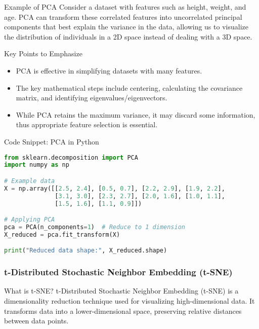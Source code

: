 \documentclass[aspectratio=169]{beamer}
\begin{document}
\begin{frame}[fragile]{Example of PCA}
    Consider a dataset with features such as height, weight, and age. 
    PCA can transform these correlated features into uncorrelated principal components that best explain the variance in the data, 
    allowing us to visualize the distribution of individuals in a 2D space instead of dealing with a 3D space.
\end{frame}

\begin{frame}[fragile]{Key Points to Emphasize}
    \begin{itemize}
        \item PCA is effective in simplifying datasets with many features.
        \item The key mathematical steps include centering, calculating the covariance matrix, and identifying eigenvalues/eigenvectors.
        \item While PCA retains the maximum variance, it may discard some information, thus appropriate feature selection is essential.
    \end{itemize}
\end{frame}

\begin{frame}[fragile]{Code Snippet: PCA in Python}
    \begin{lstlisting}[language=Python]
from sklearn.decomposition import PCA
import numpy as np

# Example data
X = np.array([[2.5, 2.4], [0.5, 0.7], [2.2, 2.9], [1.9, 2.2], 
              [3.1, 3.0], [2.3, 2.7], [2.0, 1.6], [1.0, 1.1], 
              [1.5, 1.6], [1.1, 0.9]])

# Applying PCA
pca = PCA(n_components=1)  # Reduce to 1 dimension
X_reduced = pca.fit_transform(X)

print("Reduced data shape:", X_reduced.shape)
    \end{lstlisting}
\end{frame}

\begin{frame}[fragile]
    \frametitle{t-Distributed Stochastic Neighbor Embedding (t-SNE)}
    \begin{block}{What is t-SNE?}
        t-Distributed Stochastic Neighbor Embedding (t-SNE) is a dimensionality reduction technique used for visualizing high-dimensional data. It transforms data into a lower-dimensional space, preserving relative distances between data points.
    \end{block}
\end{frame}
\end{document}
